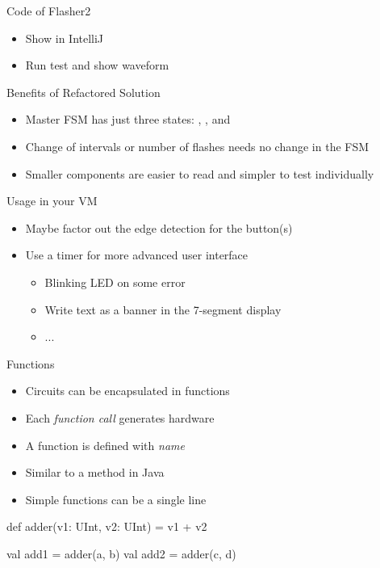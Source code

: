 \begin{frame}[fragile]{Code of Flasher2}
\begin{itemize}
\item Show in IntelliJ
\item Run test and show waveform
\end{itemize}
\end{frame}




\begin{frame}[fragile]{Benefits of Refactored Solution}
\begin{itemize}
\item Master FSM has just three states: , , and 
\item Change of intervals or number of flashes needs no change in the FSM
\item Smaller components are easier to read and simpler to test individually
\end{itemize}
\end{frame}

\begin{frame}[fragile]{Usage in your VM}
\begin{itemize}
\item Maybe factor out the edge detection for the button(s)
\item Use a timer for more advanced user interface
\begin{itemize}
\item Blinking LED on some error
\item Write text as a banner in the 7-segment display
\item ...
\end{itemize}
\end{itemize}
\end{frame}

\begin{frame}[fragile]{Functions}
\begin{itemize}
\item Circuits can be encapsulated in functions
\item Each \emph{function call} generates hardware
\item A function is defined with  \emph{name}
\item Similar to a method in Java
\item Simple functions can be a single line
\end{itemize}
\begin{chisel}
  def adder(v1: UInt, v2: UInt) = v1 + v2
  
  val add1 = adder(a, b)
  val add2 = adder(c, d)
\end{chisel}
\end{frame}

